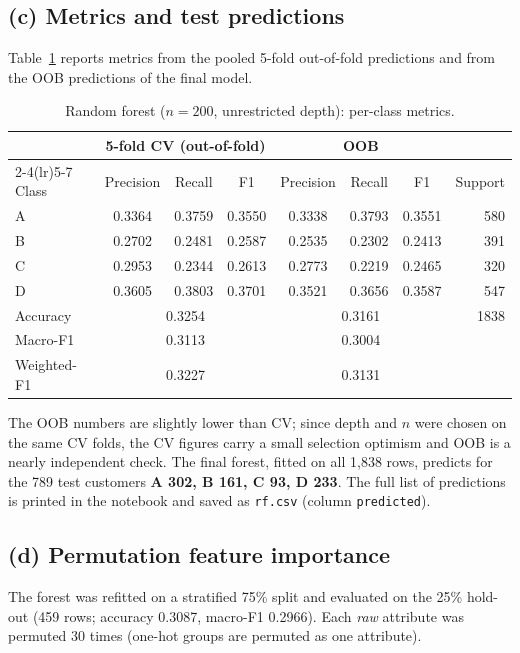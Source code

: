 \documentclass[11pt]{article}
\begin{document}
\subsection{(c) Metrics and test predictions}
Table~\ref{tab:rfmetrics} reports metrics from the pooled 5-fold out-of-fold predictions and from the
OOB predictions of the final model.

\begin{table}[H]\centering\small
\caption{Random forest ($n=200$, unrestricted depth): per-class metrics.}\label{tab:rfmetrics}
\begin{tabular}{@{}lccccccr@{}}
\toprule
& \multicolumn{3}{c}{5-fold CV (out-of-fold)} & \multicolumn{3}{c}{OOB} & \\
\cmidrule(lr){2-4}\cmidrule(lr){5-7}
Class & Precision & Recall & F1 & Precision & Recall & F1 & Support \\
\midrule
A & 0.3364 & 0.3759 & 0.3550 & 0.3338 & 0.3793 & 0.3551 & 580 \\
B & 0.2702 & 0.2481 & 0.2587 & 0.2535 & 0.2302 & 0.2413 & 391 \\
C & 0.2953 & 0.2344 & 0.2613 & 0.2773 & 0.2219 & 0.2465 & 320 \\
D & 0.3605 & 0.3803 & 0.3701 & 0.3521 & 0.3656 & 0.3587 & 547 \\
\midrule
Accuracy & \multicolumn{3}{c}{0.3254} & \multicolumn{3}{c}{0.3161} & 1838 \\
Macro-F1 & \multicolumn{3}{c}{0.3113} & \multicolumn{3}{c}{0.3004} & \\
Weighted-F1 & \multicolumn{3}{c}{0.3227} & \multicolumn{3}{c}{0.3131} & \\
\bottomrule
\end{tabular}
\end{table}

The OOB numbers are slightly lower than CV; since depth and $n$ were chosen on the same CV folds, the
CV figures carry a small selection optimism and OOB is a nearly independent check.
The final forest, fitted on all 1{,}838 rows, predicts for the 789 test customers
\textbf{A 302, B 161, C 93, D 233}. The full list of predictions is printed in the notebook and saved
as \texttt{rf.csv} (column \texttt{predicted}).

\subsection{(d) Permutation feature importance}
The forest was refitted on a stratified 75\% split and evaluated on the 25\% hold-out (459 rows;
accuracy 0.3087, macro-F1 0.2966). Each \emph{raw} attribute was permuted 30 times (one-hot groups
are permuted as one attribute).
\end{document}
